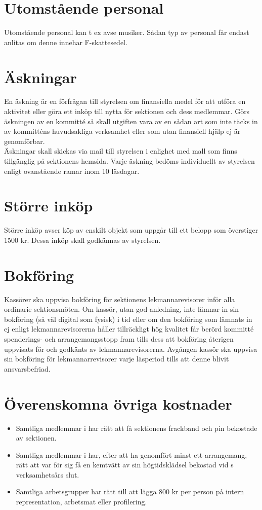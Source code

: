 \documentclass[11pt, includeaddress]{classes/cthit}
\begin{document}
\section{Utomstående personal}
Utomstående personal kan t ex avse musiker. Sådan typ av personal får endast anlitas om denne innehar F-skattesedel.

\section{Äskningar}
En äskning är en förfrågan till styrelsen om finansiella medel för att utföra en aktivitet eller göra ett inköp till nytta för sektionen och dess medlemmar. Görs äskningen av en kommitté så skall utgiften vara av en sådan art som inte täcks in av kommitténs huvudsakliga verksamhet eller som utan finansiell hjälp ej är genomförbar. \\

Äskningar skall skickas via mail till styrelsen i enlighet med mall som finns tillgänglig på sektionens hemsida. Varje äskning bedöms individuellt av styrelsen enligt ovanstående ramar inom 10 läsdagar.

\section{Större inköp}
Större inköp avser köp av enskilt objekt som uppgår till ett belopp som överstiger 1500 kr. Dessa inköp skall godkännas av styrelsen.

\section{Bokföring}
Kassörer ska uppvisa bokföring för sektionens lekmannarevisorer inför alla ordinarie sektionsmöten. 
Om kassör, utan god anledning, inte lämnar in sin bokföring (så väl digital som fysisk) i tid eller om den bokföring som lämnats in ej enligt lekmannarevisorerna håller tillräckligt hög kvalitet får berörd kommitté spenderings- och arrangemangsstopp fram tills dess att bokföring återigen uppvisats för och godkänts av lekmannarevisorerna.
Avgången kassör ska uppvisa sin bokföring för lekmannarrevisorer varje läsperiod tills att denne blivit ansvarsbefriad.

\section{Överenskomna övriga kostnader}
\begin{itemize}
	\item Samtliga medlemmar i \FANBARERIT{} har rätt att få sektionens frackband och pin bekostade av sektionen.
	\item Samtliga medlemmar i \FANBARERIT{} har, efter att ha genomfört minst ett arrangemang, rätt att var för sig få en kemtvätt av sin högtidsklädsel bekostad vid \FANBARERIT{}s verksamhetsårs slut.
        \item Samtliga arbetsgrupper har rätt till att lägga 800 kr per person på
intern representation, arbetsmat eller profilering.
\end{itemize}
\end{document}
